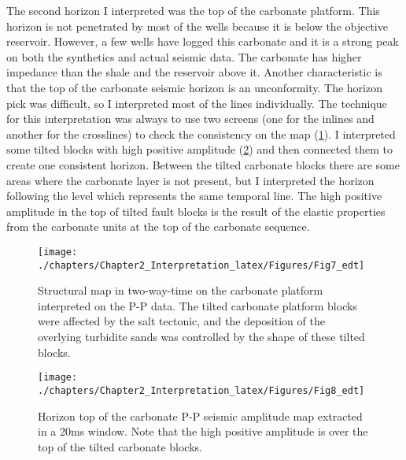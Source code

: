 	
The second horizon I interpreted was the top of the carbonate platform. This horizon is not penetrated by most of the wells because it is below the objective reservoir. However, a few wells have logged this carbonate and it is a strong peak on both the synthetics and actual seismic data. The carbonate has higher impedance than the shale and the reservoir above it. Another characteristic is that the top of the carbonate seismic horizon is an unconformity. The horizon pick was difficult, so I interpreted most of the lines individually. The technique for this interpretation was always to use  two screens (one for the inlines and another for the crosslines) to check the consistency on the map (\ref{fig:map_mac_time}). I interpreted some tilted blocks with high positive amplitude (\ref{fig:map_mac_amp}) and then connected them to create one consistent horizon. Between the tilted carbonate blocks there are some areas where the carbonate layer is not present, but I interpreted the horizon following the level which represents the same temporal line. The high positive amplitude in the top of tilted fault blocks is the result of the elastic properties from the carbonate units at the top of the carbonate sequence.
	
	
\begin{figure}[hbtp]
	\begin{center}
	\texttt{[image: ./chapters/Chapter2\_Interpretation\_latex/Figures/Fig7\_edt]}
			\caption[Structural map in two-way-time on the carbonate platform interpreted on the P-P data.]{Structural map in two-way-time on the carbonate platform interpreted on the P-P data. The tilted carbonate platform blocks were affected by the salt tectonic, and the deposition of the overlying turbidite sands was controlled by the shape of these tilted blocks.}
			\label{fig:map_mac_time}
		\end{center}
	\end{figure}	
	

\begin{figure}[hbtp]
	\begin{center}
	\texttt{[image: ./chapters/Chapter2\_Interpretation\_latex/Figures/Fig8\_edt]}
			\caption[Horizon top of the carbonate P-P seismic amplitude map extracted in a 20ms window.]{Horizon top of the carbonate P-P seismic amplitude map extracted in a 20ms window. Note that the high positive amplitude is over the top of the tilted carbonate blocks. }
			\label{fig:map_mac_amp}
		\end{center}
	\end{figure}	
	
